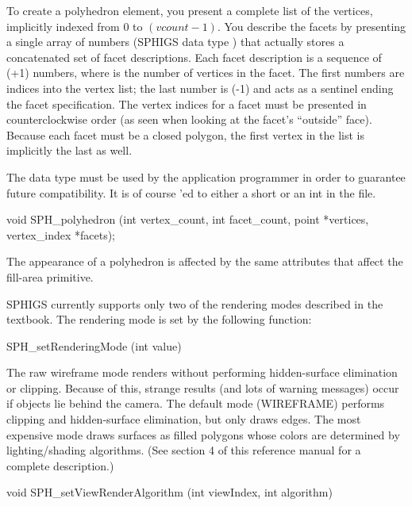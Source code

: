 To create a polyhedron element, you present a complete list of the vertices,
implicitly indexed from 0 to $(vcount-1)$.  You describe the facets by
presenting a single array of numbers (SPHIGS data type )
that actually stores a concatenated set of facet descriptions.  Each facet
description is a sequence of (+1) numbers, where  is the number
of vertices in the facet.  The first  numbers are indices into the
vertex list; the last number is (-1) and acts as a sentinel ending the facet
specification.  The vertex indices for a facet must be presented in
counterclockwise order (as seen when looking at the facet's ``outside''
face).  Because each facet must be a closed polygon, the first vertex in the
list is implicitly the last as well.

\newpar
The data type  must be used by the application programmer
in order to guarantee future compatibility.  It is of course 'ed
to either a short or an int in the  file.

\newpar
{}

\begincode
void SPH_polyhedron   \elementgenerator
   (int vertex_count, int facet_count,
    point *vertices,  vertex_index *facets);
\endcode

\newpar
The appearance of a polyhedron is affected by the same attributes that affect
the fill-area primitive.


SPHIGS currently supports only two of the rendering modes described in the
textbook.  The rendering mode is set by the following function:

\begincode
SPH_setRenderingMode (int value)  
\endcode


\newpar
The raw wireframe mode renders without performing hidden-surface elimination or
clipping.  Because of this, strange results (and lots of warning messages)
occur if objects lie behind the camera.  The default mode (WIREFRAME) performs
clipping and hidden-surface elimination, but only draws edges.  The most
expensive mode draws surfaces as filled polygons whose colors are determined by
lighting/shading algorithms.  (See section 4 of this reference manual for a
complete description.)

\begincode
void SPH_setViewRenderAlgorithm (int viewIndex, int algorithm)
\endcode

